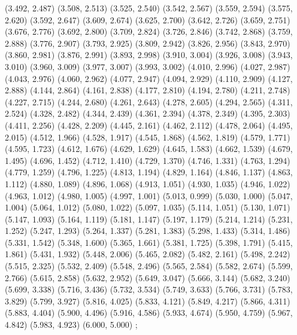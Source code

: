 {  (3.492, 2.487)
  (3.508, 2.513)
  (3.525, 2.540)
  (3.542, 2.567)
  (3.559, 2.594)
  (3.575, 2.620)
  (3.592, 2.647)
  (3.609, 2.674)
  (3.625, 2.700)
  (3.642, 2.726)
  (3.659, 2.751)
  (3.676, 2.776)
  (3.692, 2.800)
  (3.709, 2.824)
  (3.726, 2.846)
  (3.742, 2.868)
  (3.759, 2.888)
  (3.776, 2.907)
  (3.793, 2.925)
  (3.809, 2.942)
  (3.826, 2.956)
  (3.843, 2.970)
  (3.860, 2.981)
  (3.876, 2.991)
  (3.893, 2.998)
  (3.910, 3.004)
  (3.926, 3.008)
  (3.943, 3.010)
  (3.960, 3.009)
  (3.977, 3.007)
  (3.993, 3.002)
  (4.010, 2.996)
  (4.027, 2.987)
  (4.043, 2.976)
  (4.060, 2.962)
  (4.077, 2.947)
  (4.094, 2.929)
  (4.110, 2.909)
  (4.127, 2.888)
  (4.144, 2.864)
  (4.161, 2.838)
  (4.177, 2.810)
  (4.194, 2.780)
  (4.211, 2.748)
  (4.227, 2.715)
  (4.244, 2.680)
  (4.261, 2.643)
  (4.278, 2.605)
  (4.294, 2.565)
  (4.311, 2.524)
  (4.328, 2.482)
  (4.344, 2.439)
  (4.361, 2.394)
  (4.378, 2.349)
  (4.395, 2.303)
  (4.411, 2.256)
  (4.428, 2.209)
  (4.445, 2.161)
  (4.462, 2.112)
  (4.478, 2.064)
  (4.495, 2.015)
  (4.512, 1.966)
  (4.528, 1.917)
  (4.545, 1.868)
  (4.562, 1.819)
  (4.579, 1.771)
  (4.595, 1.723)
  (4.612, 1.676)
  (4.629, 1.629)
  (4.645, 1.583)
  (4.662, 1.539)
  (4.679, 1.495)
  (4.696, 1.452)
  (4.712, 1.410)
  (4.729, 1.370)
  (4.746, 1.331)
  (4.763, 1.294)
  (4.779, 1.259)
  (4.796, 1.225)
  (4.813, 1.194)
  (4.829, 1.164)
  (4.846, 1.137)
  (4.863, 1.112)
  (4.880, 1.089)
  (4.896, 1.068)
  (4.913, 1.051)
  (4.930, 1.035)
  (4.946, 1.022)
  (4.963, 1.012)
  (4.980, 1.005)
  (4.997, 1.001)
  (5.013, 0.999)
  (5.030, 1.000)
  (5.047, 1.004)
  (5.064, 1.012)
  (5.080, 1.022)
  (5.097, 1.035)
  (5.114, 1.051)
  (5.130, 1.071)
  (5.147, 1.093)
  (5.164, 1.119)
  (5.181, 1.147)
  (5.197, 1.179)
  (5.214, 1.214)
  (5.231, 1.252)
  (5.247, 1.293)
  (5.264, 1.337)
  (5.281, 1.383)
  (5.298, 1.433)
  (5.314, 1.486)
  (5.331, 1.542)
  (5.348, 1.600)
  (5.365, 1.661)
  (5.381, 1.725)
  (5.398, 1.791)
  (5.415, 1.861)
  (5.431, 1.932)
  (5.448, 2.006)
  (5.465, 2.082)
  (5.482, 2.161)
  (5.498, 2.242)
  (5.515, 2.325)
  (5.532, 2.409)
  (5.548, 2.496)
  (5.565, 2.584)
  (5.582, 2.674)
  (5.599, 2.766)
  (5.615, 2.858)
  (5.632, 2.952)
  (5.649, 3.047)
  (5.666, 3.144)
  (5.682, 3.240)
  (5.699, 3.338)
  (5.716, 3.436)
  (5.732, 3.534)
  (5.749, 3.633)
  (5.766, 3.731)
  (5.783, 3.829)
  (5.799, 3.927)
  (5.816, 4.025)
  (5.833, 4.121)
  (5.849, 4.217)
  (5.866, 4.311)
  (5.883, 4.404)
  (5.900, 4.496)
  (5.916, 4.586)
  (5.933, 4.674)
  (5.950, 4.759)
  (5.967, 4.842)
  (5.983, 4.923)
  (6.000, 5.000)
};
